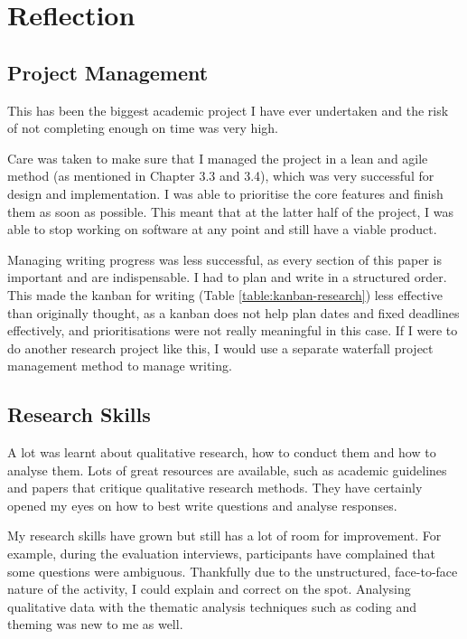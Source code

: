\chapter{Reflection} 

\section{Project Management}

This has been the biggest academic project I have ever undertaken and 
the risk of not completing enough on time was very high.

Care was taken to make sure that I managed the project in a lean and agile method (as mentioned in Chapter 3.3 and 3.4), 
which was very successful for design and implementation. 
I was able to prioritise the core features and finish them as soon as possible. 
This meant that at the latter half of the project, I was able to stop working on software at any point and still have a viable product.

Managing writing progress was less successful, as every section of this paper is important and are indispensable. 
I had to plan and write in a structured order. This made the kanban for writing (Table \ref{table:kanban-research}) 
less effective than originally thought, as a kanban does not help plan dates and fixed deadlines effectively, 
and prioritisations were not really meaningful in this case. 
If I were to do another research project like this, I would use a separate waterfall project management method to manage writing.

\section{Research Skills}

A lot was learnt about qualitative research, how to conduct them and how to analyse them.
Lots of great resources are available, such as academic guidelines and papers that critique qualitative research methods.
They have certainly opened my eyes on how to best write questions and analyse responses.

My research skills have grown but still has a lot of room for improvement. 
For example, during the evaluation interviews, participants have complained that some questions were ambiguous. 
Thankfully due to the unstructured, face-to-face nature of the activity, I could explain and correct on the spot.
Analysing qualitative data with the thematic analysis techniques such as coding and theming \citep{clarke2014thematic} 
was new to me as well.

